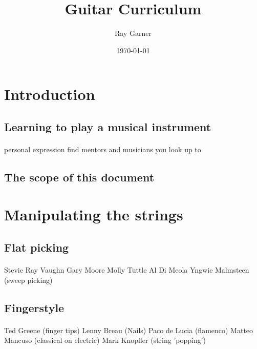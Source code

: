 \documentclass{article}
\title{Guitar Curriculum}
\date{\today}
\author{Ray Garner}
\begin{document}
\maketitle
\thispagestyle{empty}
\tableofcontents
\newpage

\section{Introduction}
\subsection{Learning to play a musical instrument}
\paragraph{}
personal expression
find mentors and musicians you look up to

\subsection{The scope of this document}
\paragraph{}


\section{Manipulating the strings}
\paragraph{}

\subsection{Flat picking}
\paragraph{}
Stevie Ray Vaughn
Gary Moore
Molly Tuttle
Al Di Meola
Yngwie Malmsteen (sweep picking)

\subsection{Fingerstyle}
\paragraph{}
Ted Greene (finger tips)
Lenny Breau (Nails)
Paco de Lucia (flamenco)
Matteo Mancuso (classical on electric)
Mark Knopfler (string 'popping')
\end{document}
